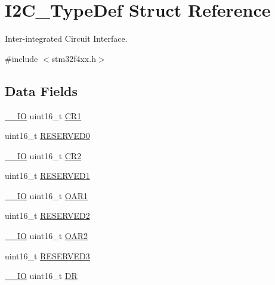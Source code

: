 \hypertarget{struct_i2_c___type_def}{}\section{I2\+C\+\_\+\+Type\+Def Struct Reference}
\label{struct_i2_c___type_def}


Inter-\/integrated Circuit Interface.  




{\ttfamily \#include $<$stm32f4xx.\+h$>$}

\subsection*{Data Fields}
\begin{DoxyCompactItemize}
\item 
\hyperlink{group___c_m_s_i_s__core__definitions_gaec43007d9998a0a0e01faede4133d6be}{\+\_\+\+\_\+\+IO} uint16\+\_\+t \hyperlink{struct_i2_c___type_def_a61400ce239355b62aa25c95fcc18a5e1}{C\+R1}
\item 
uint16\+\_\+t \hyperlink{struct_i2_c___type_def_a149feba01f9c4a49570c6d88619f504f}{R\+E\+S\+E\+R\+V\+E\+D0}
\item 
\hyperlink{group___c_m_s_i_s__core__definitions_gaec43007d9998a0a0e01faede4133d6be}{\+\_\+\+\_\+\+IO} uint16\+\_\+t \hyperlink{struct_i2_c___type_def_a2a3e81bd118d1bc52d24a0b0772e6a0c}{C\+R2}
\item 
uint16\+\_\+t \hyperlink{struct_i2_c___type_def_a8249a3955aace28d92109b391311eb30}{R\+E\+S\+E\+R\+V\+E\+D1}
\item 
\hyperlink{group___c_m_s_i_s__core__definitions_gaec43007d9998a0a0e01faede4133d6be}{\+\_\+\+\_\+\+IO} uint16\+\_\+t \hyperlink{struct_i2_c___type_def_aaab934113da0a8bcacd1ffa148046569}{O\+A\+R1}
\item 
uint16\+\_\+t \hyperlink{struct_i2_c___type_def_a5573848497a716a9947fd87487709feb}{R\+E\+S\+E\+R\+V\+E\+D2}
\item 
\hyperlink{group___c_m_s_i_s__core__definitions_gaec43007d9998a0a0e01faede4133d6be}{\+\_\+\+\_\+\+IO} uint16\+\_\+t \hyperlink{struct_i2_c___type_def_a692c0f6e38cde9ec1c3c50c36aa79817}{O\+A\+R2}
\item 
uint16\+\_\+t \hyperlink{struct_i2_c___type_def_a6c3b31022e6f59b800e9f5cc2a89d54c}{R\+E\+S\+E\+R\+V\+E\+D3}
\item 
\hyperlink{group___c_m_s_i_s__core__definitions_gaec43007d9998a0a0e01faede4133d6be}{\+\_\+\+\_\+\+IO} uint16\+\_\+t \hyperlink{struct_i2_c___type_def_a0a1acc0425516ff7969709d118b96a3b}{DR}

\end{DoxyCompactItemize}

